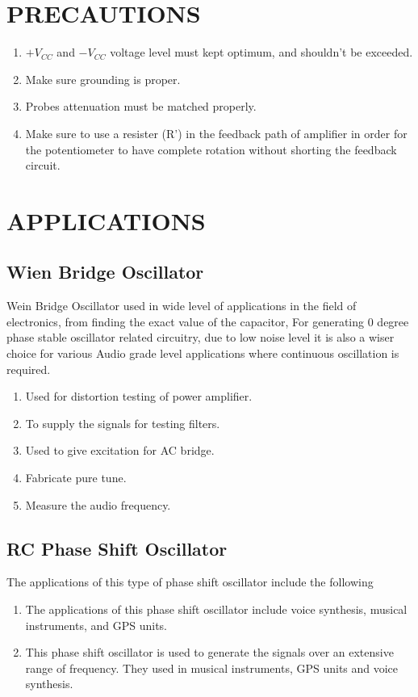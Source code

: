 \documentclass[12pt]{report}
\begin{document}
\chapter{PRECAUTIONS}
\label{cap:name2}
\begin{enumerate}
    \item  \large $+V_{CC}$ and $-V_{CC}$ voltage level must kept optimum, and shouldn’t be exceeded.
    \item \large Make sure grounding is proper. 
    \item \large Probes attenuation must be matched properly.
    \item \large Make sure to use a resister (R’) in the feedback path of amplifier in order for the potentiometer to have complete rotation without shorting the feedback circuit.    
\end{enumerate}

\chapter{APPLICATIONS}
\label{cap:name2}

\section{Wien Bridge Oscillator}
Wein Bridge Oscillator used in wide level of applications in the field of electronics, from finding the exact value of the capacitor, For generating 0 degree phase stable oscillator related circuitry, due to low noise level it is also a wiser choice for various Audio grade level applications where continuous oscillation is required.\cite{WB}
\begin{enumerate}
    \item Used for distortion testing of power amplifier.
    \item To supply the signals for testing filters. 
    \item Used to give excitation for AC bridge.
    \item Fabricate pure tune.
    \item Measure the audio frequency.
\end{enumerate}
\section{RC Phase Shift Oscillator} 
The applications of this type of phase shift oscillator include the following
\begin{enumerate}
    \item The applications of this phase shift oscillator include voice synthesis, musical instruments, and GPS units.
    \item This phase shift oscillator is used to generate the signals over an extensive range of frequency. They used in musical instruments, GPS units and voice synthesis.\cite{RC}
\end{enumerate}

\printbibliography
\end{document}
